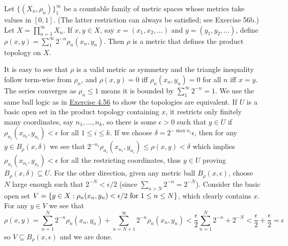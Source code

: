 \documentclass[12pt,a4paper]{article}
\begin{document}
\begin{problem}\label{prob:4-77}
Let $\{(X_n,\rho_n)\}_{1}^\infty$ be a countable family of metric spaces whose metrics take values in $[0,1]$. (The latter restriction can always be satisfied; see Exercise 56b.) Let $X = \prod_{n=1}^\infty X_n$. If $x, y \in X$, say $x = (x_1, x_2, \dots)$ and $y = (y_1, y_2, \dots)$, define $\rho(x,y) = \sum_{1}^\infty 2^{-n} \rho_n(x_n, y_n)$. Then $\rho$ is a metric that defines the product topology on $X$.
\end{problem}
\begin{solution}
    It is easy to see that $\rho$ is a valid metric as symmetry and the triangle inequality follow term-wise from $\rho_n$, and $\rho(x,y)=0$ iff $\rho_n(x_n,y_n)=0$ for all $n$ iff $x=y$.
    The series converges as $\rho_n\leq 1$ means it is bounded by $\sum_1^\infty 2^{-n}=1$.
    We use the same ball logic as in \hyperref[prob:4-56]{Exercise 4.56} to show the topologies are equivalent.
    If $U$ is a basic open set in the product topology containing $x$, it restricts only finitely many coordinates, say $n_1,\ldots,n_k$, so there is some $\epsilon>0$ such that $y\in U$ if $\rho_{n_i}(x_{n_i},y_{n_i})<\epsilon$ for all $1\leq i\leq k$.
    If we choose $\delta=2^{-\max n_i}\epsilon$, then for any $y\in B_\rho(x,\delta)$ we see that $2^{-n_i}\rho_{n_i}(x_{n_i},y_{n_i})\leq\rho(x,y)<\delta$ which implies $\rho_{n_i}(x_{n_i},y_{n_i})<\epsilon$ for all the restricting coordinates, thus $y\in U$ proving $B_\rho(x,\delta) \subseteq U$.
    For the other direction, given any metric ball $B_\rho(x,\epsilon)$, choose $N$ large enough such that $2^{-N}<\epsilon/2$ (since $\sum_{n>N}2^{-n}=2^{-N}$).
    Consider the basic open set $V=\qty{y\in X:\rho_n(x_n,y_n)<\epsilon/2\text{ for }1\leq n\leq N}$, which clearly contains $x$.
    For any $y\in V$ we see that
    \[
        \rho(x,y)=\sum_{n=1}^N 2^{-n}\rho_n(x_n,y_n)+\sum_{n=N+1}^\infty 2^{-n}\rho_n(x_n,y_n)< \frac{\epsilon}{2}\sum_{n=1}^N 2^{-n} + 2^{-N} < \frac{\epsilon}{2}+\frac{\epsilon}{2}=\epsilon
    \]
    so $V \subseteq B_\rho(x,\epsilon)$ and we are done.
\end{solution}

\end{document}
